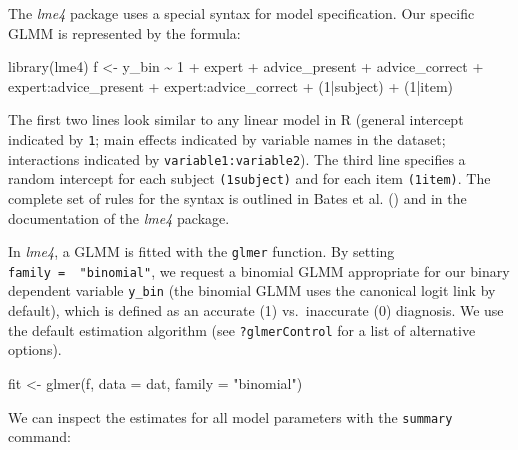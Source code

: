 \documentclass[
  man,
  floatsintext,
  longtable,
  a4paper,
  nolmodern,
  notxfonts,
  notimes,
  colorlinks=true,linkcolor=blue,citecolor=blue,urlcolor=blue]{apa7}
\newenvironment{Shaded}{\begin{snugshade}}{\end{snugshade}}
\newcommand{\AttributeTok}[1]{\textcolor[rgb]{0.40,0.45,0.13}{#1}}
\newcommand{\DecValTok}[1]{\textcolor[rgb]{0.68,0.00,0.00}{#1}}
\newcommand{\FunctionTok}[1]{\textcolor[rgb]{0.28,0.35,0.67}{#1}}
\newcommand{\NormalTok}[1]{\textcolor[rgb]{0.00,0.23,0.31}{#1}}
\newcommand{\OtherTok}[1]{\textcolor[rgb]{0.00,0.23,0.31}{#1}}
\newcommand{\SpecialCharTok}[1]{\textcolor[rgb]{0.37,0.37,0.37}{#1}}
\newcommand{\StringTok}[1]{\textcolor[rgb]{0.13,0.47,0.30}{#1}}
\begin{document}
The \emph{lme4} package uses a special syntax for model specification.
Our specific GLMM is represented by the formula:

\begin{Shaded}
\begin{Highlighting}[]
\FunctionTok{library}\NormalTok{(lme4)}
\NormalTok{f }\OtherTok{\textless{}{-}}\NormalTok{ y\_bin }\SpecialCharTok{\textasciitilde{}} \DecValTok{1} \SpecialCharTok{+}\NormalTok{ expert }\SpecialCharTok{+}\NormalTok{ advice\_present }\SpecialCharTok{+}\NormalTok{ advice\_correct }\SpecialCharTok{+} 
\NormalTok{  expert}\SpecialCharTok{:}\NormalTok{advice\_present }\SpecialCharTok{+}\NormalTok{ expert}\SpecialCharTok{:}\NormalTok{advice\_correct }\SpecialCharTok{+}
\NormalTok{  (}\DecValTok{1}\SpecialCharTok{|}\NormalTok{subject) }\SpecialCharTok{+}\NormalTok{ (}\DecValTok{1}\SpecialCharTok{|}\NormalTok{item)}
\end{Highlighting}
\end{Shaded}

The first two lines look similar to any linear model in R (general
intercept indicated by \texttt{1}; main effects indicated by variable
names in the dataset; interactions indicated by
\texttt{variable1:variable2}). The third line specifies a random
intercept for each subject \texttt{(1\textbar{}subject)} and for each
item \texttt{(1\textbar{}item)}. The complete set of rules for the
syntax is outlined in Bates et al.
() and in the
documentation of the \emph{lme4} package.

In \emph{lme4}, a GLMM is fitted with the \texttt{glmer} function. By
setting \texttt{family\ =\ \ "binomial"}, we request a binomial GLMM
appropriate for our binary dependent variable \texttt{y\_bin} (the
binomial GLMM uses the canonical logit link by default), which is
defined as an accurate (1) vs.~inaccurate (0) diagnosis. We use the
default estimation algorithm (see \texttt{?glmerControl} for a list of
alternative options).

\begin{Shaded}
\begin{Highlighting}[]
\NormalTok{fit }\OtherTok{\textless{}{-}} \FunctionTok{glmer}\NormalTok{(f, }\AttributeTok{data =}\NormalTok{ dat, }\AttributeTok{family =} \StringTok{"binomial"}\NormalTok{)}
\end{Highlighting}
\end{Shaded}

We can inspect the estimates for all model parameters with the
\texttt{summary} command:
\end{document}
